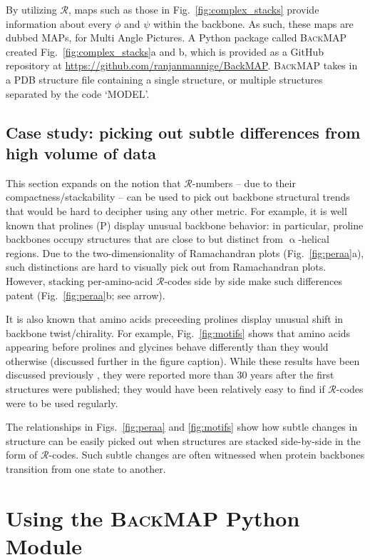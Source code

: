 \documentclass[fleqn,10pt,lineno]{wlpeerj} %
\newcommand{\Fig}[1]{Fig.~\ref{#1}}
\newcommand{\Figs}[1]{Figs.~\ref{#1}}
\newcommand{\gname}{BackMAP}
\newcommand{\pname}{\textsc{\gname}\xspace}
\newcommand{\rr}{$\mathcal{R}$\xspace}
\begin{document}
By utilizing \rr, maps such as those in \Fig{fig:complex_stacks} provide information about every $\phi$ and $\psi$ within the backbone. As such, these maps are dubbed MAPs, for Multi Angle Pictures. A Python package called \pname created \Fig{fig:complex_stacks}a and b, which is provided as a GitHub repository at \url{https://github.com/ranjanmannige/\gname}. \pname takes in a PDB structure file containing a single structure, or multiple structures separated by the code `MODEL'.

\subsection*{Case study: picking out subtle differences from high volume of data}

This section expands on the notion that \rr-numbers -- due to their compactness/stackability -- can be used to pick out backbone structural trends that would be hard to decipher using any other metric. For example, it is well known that prolines (P) display unusual backbone behavior: in particular, proline backbones occupy structures that are close to but distinct from $\upalpha$-helical regions. Due to the two-dimensionality of Ramachandran plots (\Fig{fig:peraa}a), such distinctions are hard to visually pick out from Ramachandran plots. However, stacking per-amino-acid \rr-codes side by side make such differences patent (\Fig{fig:peraa}b; see arrow).

It is also known that amino acids preceeding prolines display unusual shift in backbone twist/chirality. For example, \Fig{fig:motifs} shows that amino acids appearing before prolines and glycines behave differently than they would otherwise (discussed further in the figure caption). While these results have been discussed previously \citep{Gunasekaran1998,Ho2005}, they were reported more than 30 years after the first structures were published; they would have been relatively easy to find if \rr-codes were to be used regularly. 

The relationships in \Figs{fig:peraa} and \ref{fig:motifs} show how subtle changes in structure can be easily picked out when structures are stacked side-by-side in the form of $\mathcal{R}$-codes. Such subtle changes are often witnessed when protein backbones transition from one state to another.

\section*{Using the \pname Python Module}
\end{document}
